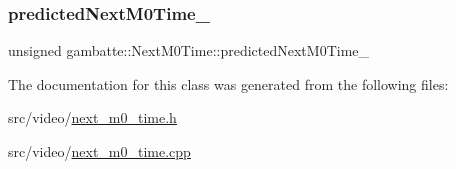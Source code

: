 \subsubsection{\texorpdfstring{predicted\+Next\+M0\+Time\+\_\+}{predictedNextM0Time\_}}
{\footnotesize\ttfamily unsigned gambatte\+::\+Next\+M0\+Time\+::predicted\+Next\+M0\+Time\+\_\+\hspace{0.3cm}{\ttfamily [private]}}



The documentation for this class was generated from the following files\+:\begin{DoxyCompactItemize}
\item 
src/video/\hyperlink{next__m0__time_8h}{next\+\_\+m0\+\_\+time.\+h}\item 
src/video/\hyperlink{next__m0__time_8cpp}{next\+\_\+m0\+\_\+time.\+cpp}\end{DoxyCompactItemize}

